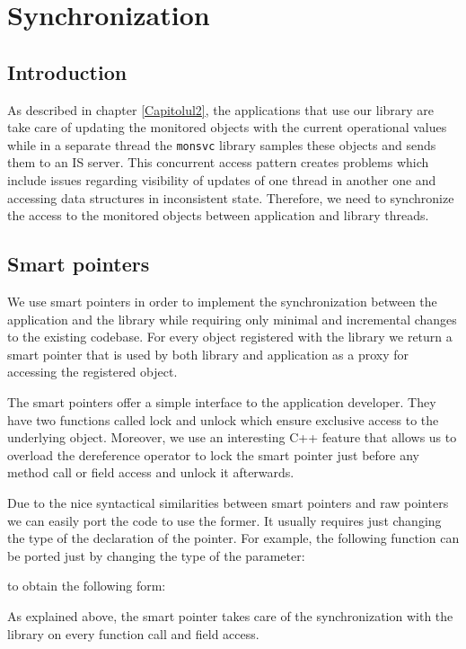 \chapter{Synchronization} %
\label{Capitolul5}

\section{Introduction}

As described in chapter \ref{Capitolul2}, the applications that use our library are take care of updating the monitored objects with the current operational values while in a separate thread the {\tt monsvc} library samples these objects and sends them to an IS server. This concurrent access pattern creates problems which include issues regarding visibility of updates of one thread in another one and accessing data structures in inconsistent state. Therefore, we need to synchronize the access to the monitored objects between application and library threads.

\section{Smart pointers}

We use smart pointers in order to implement the synchronization between the application and the library while requiring only minimal and incremental changes to the existing codebase. For every object registered with the library we return a smart pointer that is used by both library and application as a proxy for accessing the registered object. 

The smart pointers offer a simple interface to the application developer. They have two functions called lock and unlock which ensure exclusive access to the underlying object. Moreover, we use an interesting C++ feature \citep{andrei2001modern} that allows us to overload the dereference operator to lock the smart pointer just before any method call or field access and unlock it afterwards.

Due to the nice syntactical similarities between smart pointers and raw pointers we can easily port the code to use the former. It usually requires just changing the type of the declaration of the pointer. For example, the following function can be ported just by changing the type of the parameter:

to obtain the following form:

As explained above, the smart pointer takes care of the synchronization with the library on every function call and field access.


